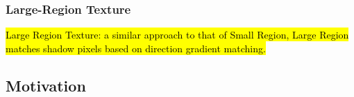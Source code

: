 \documentclass[12pt]{report}
\begin{document}
\subsubsection{Large-Region Texture}

\hl{Large Region Texture: a similar approach to that of Small Region, Large Region matches shadow pixels based on direction gradient matching.}


\subsection{Motivation}

\end{document}
